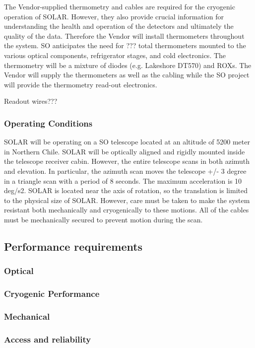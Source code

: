 \documentclass[12pt,letter]{article}
\begin{document}
The Vendor-supplied thermometry and cables are required for the cryogenic operation of SOLAR. However, they also provide crucial information for understanding the health and operation of the detectors and ultimately the quality of the data. Therefore the Vendor will install thermometers throughout the system. SO anticipates the need for ??? total thermometers mounted to the various optical components, refrigerator stages, and cold electronics. The thermometry will be a mixture of diodes (e.g. Lakeshore DT570) and ROXs. The Vendor will supply the thermometers as well as the cabling while the SO project will provide the thermometry read-out electronics.

Readout wires???

    \subsubsection{Operating Conditions}
    
    SOLAR will be operating on a SO telescope located at an altitude of 5200 meter in Northern Chile. SOLAR will be optically aligned and rigidly mounted inside the telescope receiver cabin. However, the entire telescope scans in both azimuth and elevation. In particular, the azimuth scan moves the telescope +/- 3 degree in a triangle scan with a period of 8 seconds. The maximum acceleration is 10 deg/s2. SOLAR is located near the axis of rotation, so the translation is limited to the physical size of SOLAR. However, care must be taken to make the system resistant both mechanically and cryogenically to these motions. All of the cables must be mechanically secured to prevent motion during the scan.
    
\subsection{Performance requirements}
    \subsubsection{Optical}
    \subsubsection{Cryogenic Performance}
    \subsubsection{Mechanical}
    \subsubsection{Access and reliability}
\end{document}
